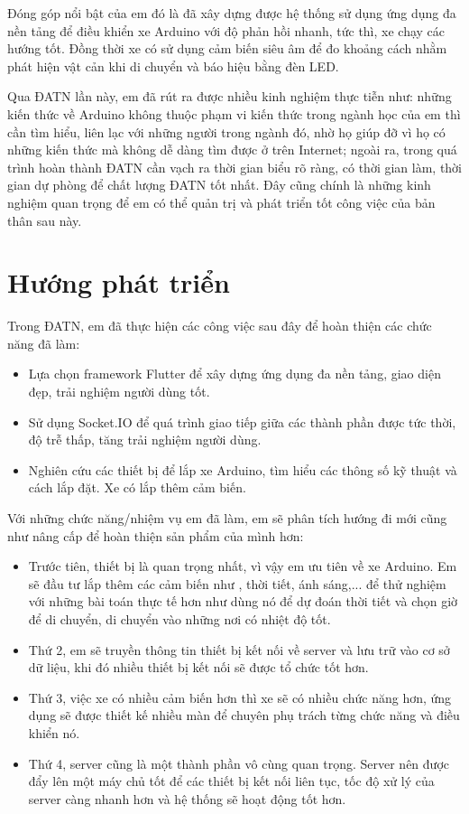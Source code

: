 \documentclass[../DoAn.tex]{subfiles}
\begin{document}
Đóng góp nổi bật của em đó là đã xây dựng được hệ thống sử dụng ứng dụng đa nền tảng để điều khiển xe Arduino với độ phản hồi nhanh, tức thì, xe chạy các hướng tốt. Đồng thời xe có sử dụng cảm biến siêu âm để đo khoảng cách nhằm phát hiện vật cản khi di chuyển và báo hiệu bằng đèn LED. 

Qua ĐATN lần này, em đã rút ra được nhiều kinh nghiệm thực tiễn như: những kiến thức về Arduino không thuộc phạm vi kiến thức trong ngành học của em thì cần tìm hiểu, liên lạc với những người trong ngành đó, nhờ họ giúp đỡ vì họ có những kiến thức mà không dễ dàng tìm được ở trên Internet; ngoài ra, trong quá trình hoàn thành ĐATN cần vạch ra thời gian biểu rõ ràng, có thời gian làm, thời gian dự phòng để chất lượng ĐATN tốt nhất. Đây cũng chính là những kinh nghiệm quan trọng để em có thể quản trị và phát triển tốt công việc của bản thân sau này.

\section{Hướng phát triển}

Trong ĐATN, em đã thực hiện các công việc sau đây để hoàn thiện các chức năng đã làm:
\begin{itemize}
    \item Lựa chọn framework Flutter để xây dựng ứng dụng đa nền tảng, giao diện đẹp, trải nghiệm người dùng tốt.
    \item Sử dụng Socket.IO để quá trình giao tiếp giữa các thành phần được tức thời, độ trễ thấp, tăng trải nghiệm người dùng.
    \item Nghiên cứu các thiết bị để lắp xe Arduino, tìm hiểu các thông số kỹ thuật và cách lắp đặt. Xe có lắp thêm cảm biến.
\end{itemize}

Với những chức năng/nhiệm vụ em đã làm, em sẽ phân tích hướng đi mới cũng như nâng cấp để hoàn thiện sản phẩm của mình hơn:

\begin{itemize}
    \item Trước tiên, thiết bị là quan trọng nhất, vì vậy em ưu tiên về xe Arduino. Em sẽ đầu tư lắp thêm các cảm biến như , thời tiết, ánh sáng,... để thử nghiệm với những bài toán thực tế hơn như dùng nó để dự đoán thời tiết và chọn giờ để di chuyển, di chuyển vào những nơi có nhiệt độ tốt.
    \item Thứ 2, em sẽ truyền thông tin thiết bị kết nối về server và lưu trữ vào cơ sở dữ liệu, khi đó nhiều thiết bị kết nối sẽ được tổ chức tốt hơn.
    \item Thứ 3, việc xe có nhiều cảm biến hơn thì xe sẽ có nhiều chức năng hơn, ứng dụng sẽ được thiết kế nhiều màn để chuyên phụ trách từng chức năng và điều khiển nó.
    \item Thứ 4, server cũng là một thành phần vô cùng quan trọng. Server nên được đẩy lên một máy chủ tốt để các thiết bị kết nối liên tục, tốc độ xử lý của server càng nhanh hơn và hệ thống sẽ hoạt động tốt hơn.
\end{itemize}
\end{document}
